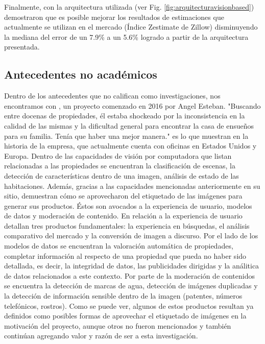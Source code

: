 Finalmente, con la arquitectura utilizada (ver Fig. 	\ref{fig:arquitecturavisionbased}) demostraron que es posible mejorar los resultados de estimaciones que actualmente se utilizan en el mercado (Índice Zestimate de Zillow) disminuyendo la mediana del error de un 7.9\% a un 5.6\% logrado a partir de la arquitectura presentada.

\subsection{Antecedentes no académicos}
Dentro de los antecedentes que no califican como investigaciones, nos encontramos con \cite{restb_ai}, un proyecto comenzado en 2016 por Angel Esteban. "Buscando entre docenas de propiedades, él estaba shockeado por la inconsistencia en la calidad de las mismas y la dificultad general para encontrar la casa de ensueños para su familia. Tenía que haber una mejor manera." es lo que muestran en la historia de la empresa, que actualmente cuenta con oficinas en Estados Unidos y Europa.
Dentro de las capacidades de visión por computadora que listan relacionadas a las propiedades se encuentran la clasificación de escenas, la detección de características dentro de una imagen, análisis de estado de las habitaciones.
Además, gracias a las capacidades mencionadas anteriormente en su sitio, demuestran cómo se aprovecharon del etiquetado de las imágenes para generar sus productos. Éstos son avocados a la experiencia de usuario, modelos de datos y moderación de contenido. En relación a la experiencia de usuario detallan tres productos fundamentales: la experiencia en búsquedas, el análisis comparativo del mercado y la conversión de imagen a discurso. Por el lado de los modelos de datos se encuentran la valoración automática de propiedades, completar información al respecto de una propiedad que pueda no haber sido detallada, es decir, la integridad de datos, las publicidades dirigidas y la análitica de datos relacionados a este contexto. Por parte de la moderación de contenidos se encuentra la detección de marcas de agua, detección de imágenes duplicadas y la detección de información sensible dentro de la imagen (patentes, números telefónicos, rostros).
Como se puede ver, algunos de estos productos resultan ya definidos como posibles formas de aprovechar el etiquetado de imágenes en la motivación del proyecto, aunque otros no fueron mencionados y también continúan agregando valor y razón de ser a esta investigación.